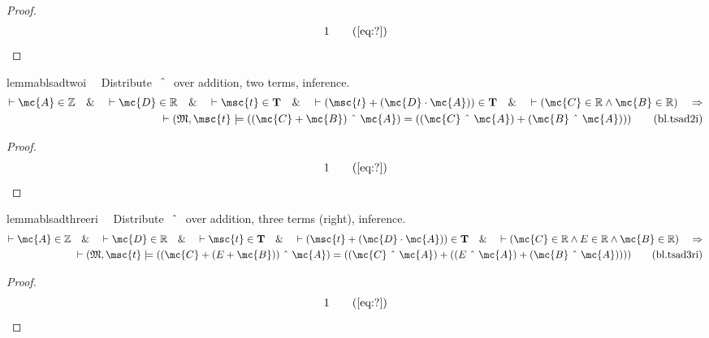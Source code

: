 \begin{proof}
\begin{align}
  1 &&  & &(\mbox{\ref{eq:?}})\notag
\end{align}
\end{proof}

\begin{restatable}{lemma}{blsadtwoi}~~ Distribute $~\string^~$ over addition,
two terms, inference.
\begin{align}
\vdash \mc{A} \in \mathbb{Z}\quad\&\quad \vdash \mc{D} \in
    \mathbb{R}\quad\&\quad \vdash \msc{t} \in \mathbf{T}\quad\&\quad \vdash (
    \msc{t} + ( \mc{D} \cdot \mc{A} ) ) \in \mathbf{T}\quad\&\quad \vdash (
    \mc{C} \in \mathbb{R} \wedge \mc{B} \in \mathbb{R} )\quad\Rightarrow \notag \\ 
	\quad
    \vdash ( \mathfrak{M} , \msc{t} \models ( ( \mc{C} + \mc{B} ) ~\string^~
    \mc{A} ) = ( ( \mc{C} ~\string^~ \mc{A} ) + ( \mc{B} ~\string^~ \mc{A} ) )
    )\label{eq:bl.tsad2i}\tag{bl.tsad2i}
\end{align}
\end{restatable}

\begin{proof}
\begin{align}
  1 &&  & &(\mbox{\ref{eq:?}})\notag
\end{align}
\end{proof}

\begin{restatable}{lemma}{blsadthreeri}~~ Distribute $~\string^~$ over addition,
three terms (right), inference.
\begin{align}
\vdash \mc{A} \in \mathbb{Z}\quad\&\quad \vdash \mc{D} \in
    \mathbb{R}\quad\&\quad \vdash \msc{t} \in \mathbf{T}\quad\&\quad \vdash (
    \msc{t} + ( \mc{D} \cdot \mc{A} ) ) \in \mathbf{T}\quad\&\quad \vdash (
    \mc{C} \in \mathbb{R} \wedge E \in \mathbb{R} \wedge \mc{B} \in \mathbb{R}
    )\quad\Rightarrow \notag \\ 
	\quad \vdash ( \mathfrak{M} , \msc{t} \models ( ( \mc{C} +
    ( E + \mc{B} ) ) ~\string^~ \mc{A} ) = ( ( \mc{C} ~\string^~ \mc{A} ) + ( (
    E ~\string^~ \mc{A} ) + ( \mc{B} ~\string^~ \mc{A} ) ) )
    )\label{eq:bl.tsad3ri}\tag{bl.tsad3ri}
\end{align}
\end{restatable}

\begin{proof}
\begin{align}
  1 &&  & &(\mbox{\ref{eq:?}})\notag
\end{align}
\end{proof}

